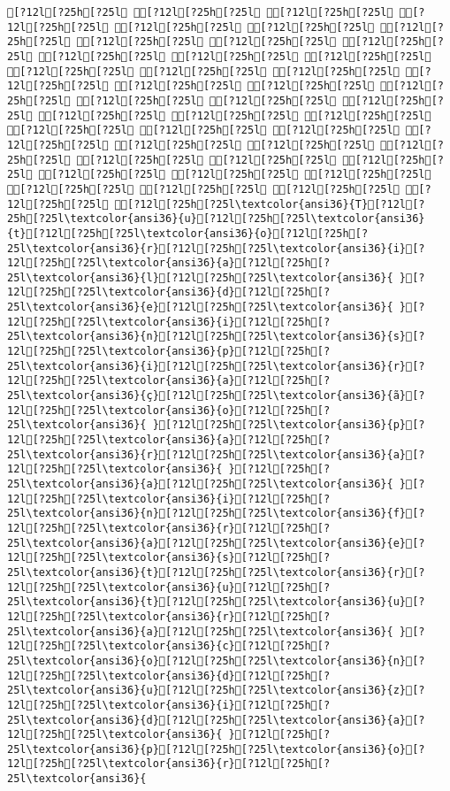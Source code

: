 \documentclass{scrartcl}
\begin{document}
\begin{Verbatim}
[?12l[?25h[?25l [?12l[?25h[?25l [?12l[?25h[?25l [?12l[?25h[?25l [?12l[?25h[?25l [?12l[?25h[?25l [?12l[?25h[?25l [?12l[?25h[?25l [?12l[?25h[?25l [?12l[?25h[?25l [?12l[?25h[?25l [?12l[?25h[?25l [?12l[?25h[?25l [?12l[?25h[?25l [?12l[?25h[?25l [?12l[?25h[?25l [?12l[?25h[?25l [?12l[?25h[?25l [?12l[?25h[?25l [?12l[?25h[?25l [?12l[?25h[?25l [?12l[?25h[?25l [?12l[?25h[?25l [?12l[?25h[?25l [?12l[?25h[?25l [?12l[?25h[?25l [?12l[?25h[?25l [?12l[?25h[?25l [?12l[?25h[?25l [?12l[?25h[?25l [?12l[?25h[?25l [?12l[?25h[?25l [?12l[?25h[?25l [?12l[?25h[?25l [?12l[?25h[?25l [?12l[?25h[?25l [?12l[?25h[?25l [?12l[?25h[?25l [?12l[?25h[?25l [?12l[?25h[?25l [?12l[?25h[?25l [?12l[?25h[?25l [?12l[?25h[?25l [?12l[?25h[?25l\textcolor{ansi36}{T}[?12l[?25h[?25l\textcolor{ansi36}{u}[?12l[?25h[?25l\textcolor{ansi36}{t}[?12l[?25h[?25l\textcolor{ansi36}{o}[?12l[?25h[?25l\textcolor{ansi36}{r}[?12l[?25h[?25l\textcolor{ansi36}{i}[?12l[?25h[?25l\textcolor{ansi36}{a}[?12l[?25h[?25l\textcolor{ansi36}{l}[?12l[?25h[?25l\textcolor{ansi36}{ }[?12l[?25h[?25l\textcolor{ansi36}{d}[?12l[?25h[?25l\textcolor{ansi36}{e}[?12l[?25h[?25l\textcolor{ansi36}{ }[?12l[?25h[?25l\textcolor{ansi36}{i}[?12l[?25h[?25l\textcolor{ansi36}{n}[?12l[?25h[?25l\textcolor{ansi36}{s}[?12l[?25h[?25l\textcolor{ansi36}{p}[?12l[?25h[?25l\textcolor{ansi36}{i}[?12l[?25h[?25l\textcolor{ansi36}{r}[?12l[?25h[?25l\textcolor{ansi36}{a}[?12l[?25h[?25l\textcolor{ansi36}{ç}[?12l[?25h[?25l\textcolor{ansi36}{ã}[?12l[?25h[?25l\textcolor{ansi36}{o}[?12l[?25h[?25l\textcolor{ansi36}{ }[?12l[?25h[?25l\textcolor{ansi36}{p}[?12l[?25h[?25l\textcolor{ansi36}{a}[?12l[?25h[?25l\textcolor{ansi36}{r}[?12l[?25h[?25l\textcolor{ansi36}{a}[?12l[?25h[?25l\textcolor{ansi36}{ }[?12l[?25h[?25l\textcolor{ansi36}{a}[?12l[?25h[?25l\textcolor{ansi36}{ }[?12l[?25h[?25l\textcolor{ansi36}{i}[?12l[?25h[?25l\textcolor{ansi36}{n}[?12l[?25h[?25l\textcolor{ansi36}{f}[?12l[?25h[?25l\textcolor{ansi36}{r}[?12l[?25h[?25l\textcolor{ansi36}{a}[?12l[?25h[?25l\textcolor{ansi36}{e}[?12l[?25h[?25l\textcolor{ansi36}{s}[?12l[?25h[?25l\textcolor{ansi36}{t}[?12l[?25h[?25l\textcolor{ansi36}{r}[?12l[?25h[?25l\textcolor{ansi36}{u}[?12l[?25h[?25l\textcolor{ansi36}{t}[?12l[?25h[?25l\textcolor{ansi36}{u}[?12l[?25h[?25l\textcolor{ansi36}{r}[?12l[?25h[?25l\textcolor{ansi36}{a}[?12l[?25h[?25l\textcolor{ansi36}{ }[?12l[?25h[?25l\textcolor{ansi36}{c}[?12l[?25h[?25l\textcolor{ansi36}{o}[?12l[?25h[?25l\textcolor{ansi36}{n}[?12l[?25h[?25l\textcolor{ansi36}{d}[?12l[?25h[?25l\textcolor{ansi36}{u}[?12l[?25h[?25l\textcolor{ansi36}{z}[?12l[?25h[?25l\textcolor{ansi36}{i}[?12l[?25h[?25l\textcolor{ansi36}{d}[?12l[?25h[?25l\textcolor{ansi36}{a}[?12l[?25h[?25l\textcolor{ansi36}{ }[?12l[?25h[?25l\textcolor{ansi36}{p}[?12l[?25h[?25l\textcolor{ansi36}{o}[?12l[?25h[?25l\textcolor{ansi36}{r}[?12l[?25h[?25l\textcolor{ansi36}{ 
\end{Verbatim}
\end{document}
